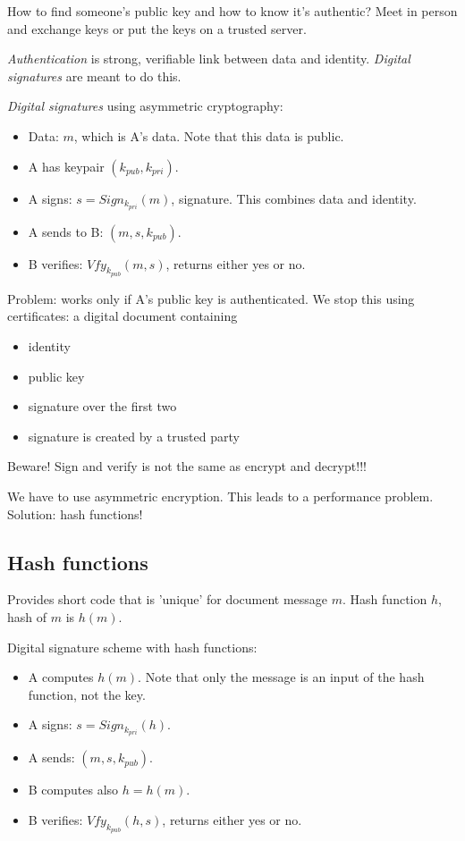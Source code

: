 \documentclass[language=english,number=]{homework}
\begin{document}
    How to find someone's public key and how to know it's authentic?
    Meet in person and exchange keys or put the keys on a trusted server.

    \textit{Authentication} is strong, verifiable link between data and identity.
    \textit{Digital signatures} are meant to do this.

    \textit{Digital signatures} using asymmetric cryptography:
    \begin{itemize}
        \item Data: $m$, which is A's data.
        Note that this data is public.
        \item A has keypair $(k_{pub}, k_{pri})$.
        \item A signs: $s = Sign_{k_{pri}}(m)$, signature.
        This combines data and identity.
        \item A sends to B: $(m,s,k_{pub})$.
        \item B verifies: $Vfy_{k_{pub}}(m,s)$, returns either yes or no.
    \end{itemize}

    Problem: works only if A's public key is authenticated.
    We stop this using certificates: a digital document containing
    \begin{itemize}
        \item identity
        \item public key
        \item signature over the first two
        \item signature is created by a trusted party
    \end{itemize}

    Beware!
    Sign and verify is not the same as encrypt and decrypt!!!

    We have to use asymmetric encryption.
    This leads to a performance problem.
    Solution: hash functions!

    \subsection{Hash functions}

    Provides short code that is 'unique' for document message $m$.
    Hash function $h$, hash of $m$ is $h(m)$.

    Digital signature scheme with hash functions:
    \begin{itemize}
        \item A computes $h(m)$.
        Note that only the message is an input of the hash function, not the key.
        \item A signs: $s = Sign_{k_{pri}}(h)$.
        \item A sends: $(m,s,k_{pub})$.
        \item B computes also $h = h(m)$.
        \item B verifies: $Vfy_{k_{pub}}(h,s)$, returns either yes or no.
    \end{itemize}
\end{document}
